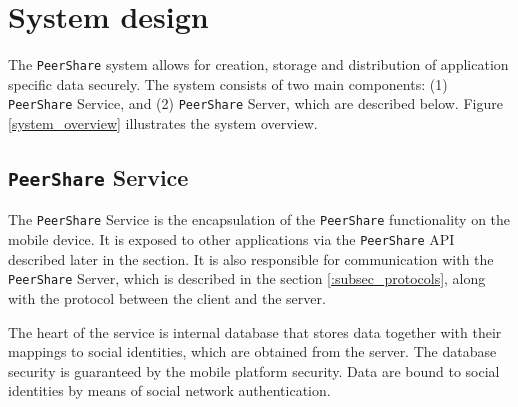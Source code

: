 \documentclass[twocolumn,a4paper,10pt]{article}
\newcommand{\peershare}{\texttt{PeerShare}\xspace}
\begin{document}
\section{System design}
\label{:design}
The \peershare system allows for creation, storage and distribution of application specific data securely. The system consists of two main components: (1) \peershare Service, and (2) \peershare Server, which are described below. Figure \ref{system_overview} illustrates the system overview.

\subsection{\peershare Service}


\label{:subsec_service}
The \peershare Service is the encapsulation of the \peershare functionality on the mobile device. It is exposed to other applications via the \peershare API described later in the section. It is also responsible for communication with the \peershare Server, which is described in the section \ref{:subsec_protocols}, along with the protocol between the client and the server. 

The heart of the service is internal database that stores data together with their mappings to social identities, which are obtained from the server. The database security is guaranteed by the mobile platform security. Data are bound to social identities by means of social network authentication. 
\end{document}
